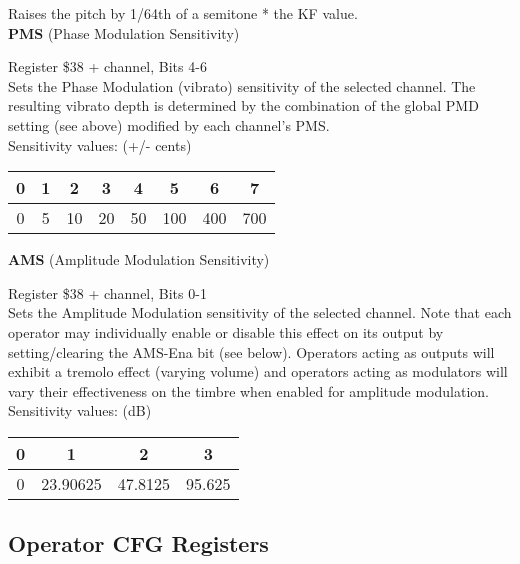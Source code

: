 Raises the pitch by 1/64th of a semitone * the KF value.\\

{\bfseries PMS} (Phase Modulation Sensitivity)

Register \$38 + channel, Bits 4-6\\

Sets the Phase Modulation (vibrato) sensitivity of the selected channel. The
resulting vibrato depth is determined by the combination of the global PMD
setting (see above) modified by each channel's PMS.\\

Sensitivity values: (+/- cents)

\begin{tabular}{|c|c|c|c|c|c|c|c|}
	\hline

	0&1&2&3&4&5&6&7\\ \hline

	0&5&10&20&50&100&400&700\\

	\hline
\end{tabular}

\vspace{16pt}


{\bfseries AMS} (Amplitude Modulation Sensitivity)

Register \$38 + channel, Bits 0-1\\

Sets the Amplitude Modulation sensitivity of the selected channel. Note that
each operator may individually enable or disable this effect on its output by
setting/clearing the AMS-Ena bit (see below). Operators acting as outputs will
exhibit a tremolo effect (varying volume) and operators acting as modulators
will vary their effectiveness on the timbre when enabled for amplitude
modulation.\\

Sensitivity values: (dB)

\begin{tabular}{|c|c|c|c|}
	\hline

	0&1&2&3\\ \hline

	0&23.90625&47.8125&95.625\\

	\hline
\end{tabular}

\vspace{16pt}


\clearpage

\subsection{Operator CFG Registers}

